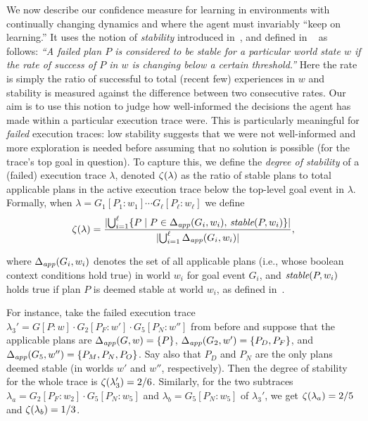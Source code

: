 We now describe our confidence measure for learning in environments with continually changing dynamics and where the agent must invariably ``keep on learning.'' It uses the notion of {\em stability} introduced in~\cite{airiau09:enhancing}, and defined in ~\cite{singh10:learning} as follows:
%
\emph{``A failed plan $P$ is considered to be stable for a particular world state $w$ if the rate of success of $P$ in $w$ is changing below a certain threshold.''}
Here the rate is simply the ratio of successful to total (recent few) experiences in $w$ and stability is measured against the difference between two consecutive rates.
%
Our aim is to use this notion to judge how  well-informed the decisions the agent has made within a particular execution trace were. This is particularly meaningful for \emph{failed} execution traces: low stability suggests that we were not well-informed and more exploration is needed before assuming that no solution is possible (for the trace's top goal in question).
To capture this, we define the \emph{degree of stability} of a (failed) execution trace $\lambda$, denoted $\zeta(\lambda)$ as the ratio of stable plans to total applicable plans in the active execution trace below the top-level goal event in $\lambda$. Formally, when $\lambda= G_1[P_1:w_1] \cdots G_\ell[P_\ell:w_\ell]$ we define 
\[
\zeta(\lambda) = 
	\frac{ 
			|{ \bigcup_{i=1}^\ell \{P \mid P \in \Delta_{\operatorname{\textit{app}}}(G_i,w_i),\, \operatorname{\textit{stable}}(P,w_i)\} }| 
		}
		{
			|{	\bigcup_{i=1}^\ell \Delta_{\operatorname{\textit{app}}}(G_i,w_i) }| 
		},
\]

\noindent
where  $\Delta_{\operatorname{\textit{app}}}(G_i,w_i)$ denotes the set of all applicable plans (i.e., whose boolean context conditions hold true) in world $w_i$ for goal event $G_i$, and $\operatorname{\textit{stable}}(P,w_i)$ holds true if plan $P$ is deemed stable at world $w_i$, as defined in~\cite{singh10:learning}.

For instance, take the failed execution trace $\lambda_3' = G[P:w] \cdot G_2[P_F:w'] \cdot G_5[P_N:w'']$ from before and suppose that the applicable plans are $\Delta_{\operatorname{\textit{app}}}(G,w) = \{P\}$, $\Delta_{\operatorname{\textit{app}}}(G_2,w') = \{P_D,P_F\}$, and $\Delta_{\operatorname{\textit{app}}}(G_5,w'') = \{P_M,P_N,P_O\}$. Say also that $P_D$ and $P_N$ are the only plans deemed stable (in worlds $w'$ and $w''$, respectively). 
Then the degree of stability for the whole trace is $\zeta(\lambda_3')= 2/6$.
Similarly, for the two subtraces $\lambda_a= G_2[P_F:w_2] \cdot G_5[P_N:w_5]$ and $\lambda_b =G_5[P_N:w_5]$ of $\lambda_3'$, we get $\zeta(\lambda_a) = 2/5$ and $\zeta(\lambda_b) = 1/3$.



